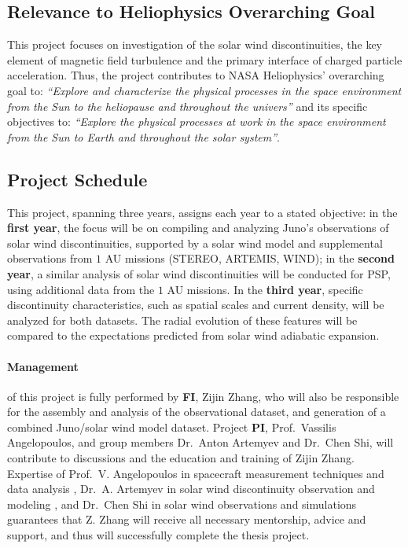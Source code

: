 \documentclass[
  letterpaper,
  DIV=11,
  numbers=noendperiod]{scrartcl}
\let\oldparagraph\paragraph
\renewcommand{\paragraph}[1]{\oldparagraph{#1}\mbox{}}
\begin{document}
\subsection{Relevance to Heliophysics Overarching
Goal}\label{relevance-to-heliophysics-overarching-goal}

This project focuses on investigation of the solar wind discontinuities,
the key element of magnetic field turbulence and the primary interface
of charged particle acceleration. Thus, the project contributes to NASA
Heliophysics' overarching goal to: \emph{``Explore and characterize the
physical processes in the space environment from the Sun to the
heliopause and throughout the univers''} and its specific objectives to:
\emph{``Explore the physical processes at work in the space environment
from the Sun to Earth and throughout the solar system''}.

\subsection{Project Schedule}\label{project-schedule}

This project, spanning three years, assigns each year to a stated
objective: in the \textbf{first year}, the focus will be on compiling
and analyzing Juno's observations of solar wind discontinuities,
supported by a solar wind model and supplemental observations from \(1\)
AU missions (STEREO, ARTEMIS, WIND); in the \textbf{second year}, a
similar analysis of solar wind discontinuities will be conducted for
PSP, using additional data from the \(1\) AU missions. In the
\textbf{third year}, specific discontinuity characteristics, such as
spatial scales and current density, will be analyzed for both datasets.
The radial evolution of these features will be compared to the
expectations predicted from solar wind adiabatic expansion.

\paragraph{Management}\label{management}

of this project is fully performed by \textbf{FI}, Zijin Zhang, who will
also be responsible for the assembly and analysis of the observational
dataset, and generation of a combined Juno/solar wind model dataset.
Project \textbf{PI}, Prof.~Vassilis Angelopoulos, and group members
Dr.~Anton Artemyev and Dr.~Chen Shi, will contribute to discussions and
the education and training of Zijin Zhang. Expertise of Prof.~V.
Angelopoulos in spacecraft measurement techniques and data analysis
\cite{Angelopoulos19,Angelopoulos11:ARTEMIS}, Dr.~A. Artemyev in solar
wind discontinuity observation and modeling
\citep{Artemyev18:apj,Artemyev19:jgr:solarwind}, and Dr.~Chen Shi in
solar wind observations and simulations
\citep{ChenShi21:a&a,ChenShi22:apj,ChenShi23:apj} guarantees that Z.
Zhang will receive all necessary mentorship, advice and support, and
thus will successfully complete the thesis project.
\end{document}
